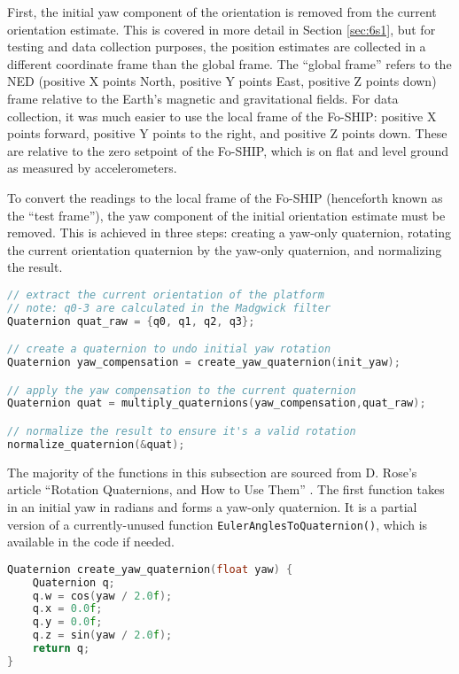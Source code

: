 \documentclass[11pt]{ucthesisCP}
\begin{document}
First, the initial yaw component of the orientation is removed from the current orientation estimate. This is covered in more detail in Section \ref{sec:6s1}, but for testing and data collection purposes, the position estimates are collected in a different coordinate frame than the global frame. The “global frame” refers to the NED (positive X points North, positive Y points East, positive Z points down) frame relative to the Earth’s magnetic and gravitational fields. For data collection, it was much easier to use the local frame of the Fo-SHIP: positive X points forward, positive Y points to the right, and positive Z points down. These are relative to the zero setpoint of the Fo-SHIP, which is on flat and level ground as measured by accelerometers. 

To convert the readings to the local frame of the Fo-SHIP (henceforth known as the “test frame”), the yaw component of the initial orientation estimate must be removed. This is achieved in three steps: creating a yaw-only quaternion, rotating the current orientation quaternion by the yaw-only quaternion, and normalizing the result.

\begin{lstlisting}[language=C++]
// extract the current orientation of the platform
// note: q0-3 are calculated in the Madgwick filter
Quaternion quat_raw = {q0, q1, q2, q3};

// create a quaternion to undo initial yaw rotation
Quaternion yaw_compensation = create_yaw_quaternion(init_yaw);

// apply the yaw compensation to the current quaternion
Quaternion quat = multiply_quaternions(yaw_compensation,quat_raw);

// normalize the result to ensure it's a valid rotation
normalize_quaternion(&quat);
\end{lstlisting}

The majority of the functions in this subsection are sourced from D. Rose’s article “Rotation Quaternions, and How to Use Them” \cite{quaternionuse}. The first function takes in an initial yaw in radians and forms a yaw-only quaternion. It is a partial version of a currently-unused function \verb|EulerAnglesToQuaternion()|, which is available in the code if needed.

\begin{lstlisting}[language=C++]
Quaternion create_yaw_quaternion(float yaw) {
	Quaternion q;
	q.w = cos(yaw / 2.0f);
	q.x = 0.0f;
	q.y = 0.0f;
	q.z = sin(yaw / 2.0f);
	return q;
}
\end{lstlisting}
\end{document}
